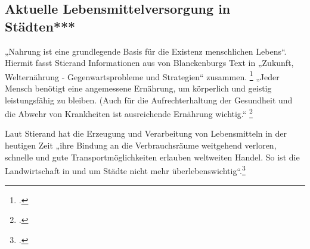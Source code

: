 \documentclass{scrartcl}
\begin{document}





\subsection{Aktuelle Lebensmittelversorgung in Städten***} 

„Nahrung ist eine grundlegende Basis für die Existenz menschlichen Lebens“. Hiermit fasst Stierand Informationen aus von Blanckenburgs Text in „Zukunft, Welternährung - Gegenwartsprobleme und Strategien“ zusammen. \footcite[S.122f]{Stierand2008StadtLebensmittel} „Jeder Mensch benötigt eine angemessene Ernährung, um körperlich und geistig leistungsfähig zu bleiben. (Auch für die Aufrechterhaltung der Gesundheit und die Abwehr von Krankheiten ist ausreichende Ernährung wichtig.“ \footcite{Blanckenburg1987ZukunftDie}

Laut Stierand hat die Erzeugung und Verarbeitung von Lebensmitteln in der heutigen Zeit „ihre Bindung an die Verbrauchsräume weitgehend verloren, schnelle und gute Transportmöglichkeiten erlauben weltweiten Handel. So ist die Landwirtschaft in und um Städte nicht mehr überlebenswichtig“.\footcite[S.122f]{Stierand2008StadtLebensmittel} 
\end{document}
